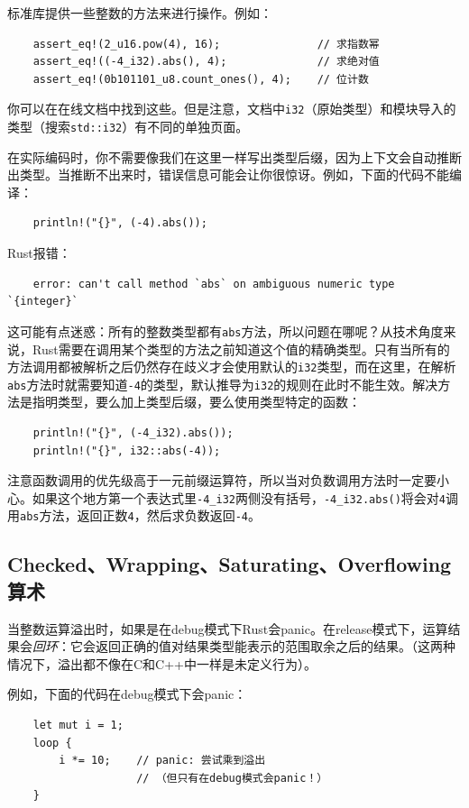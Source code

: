 标准库提供一些整数的方法来进行操作。例如：
\begin{verbatim}
    assert_eq!(2_u16.pow(4), 16);               // 求指数幂
    assert_eq!((-4_i32).abs(), 4);              // 求绝对值
    assert_eq!(0b101101_u8.count_ones(), 4);    // 位计数
\end{verbatim}

你可以在在线文档中找到这些。但是注意，文档中\texttt{i32}（原始类型）和模块导入的类型（搜索\texttt{std::i32}）有不同的单独页面。

在实际编码时，你不需要像我们在这里一样写出类型后缀，因为上下文会自动推断出类型。当推断不出来时，错误信息可能会让你很惊讶。例如，下面的代码不能编译：
\begin{verbatim}
    println!("{}", (-4).abs());
\end{verbatim}

Rust报错：
\begin{verbatim}
    error: can't call method `abs` on ambiguous numeric type `{integer}`
\end{verbatim}

这可能有点迷惑：所有的整数类型都有\texttt{abs}方法，所以问题在哪呢？从技术角度来说，Rust需要在调用某个类型的方法之前知道这个值的精确类型。只有当所有的方法调用都被解析之后仍然存在歧义才会使用默认的\texttt{i32}类型，而在这里，在解析\texttt{abs}方法时就需要知道\texttt{-4}的类型，默认推导为\texttt{i32}的规则在此时不能生效。解决方法是指明类型，要么加上类型后缀，要么使用类型特定的函数：
\begin{verbatim}
    println!("{}", (-4_i32).abs());
    println!("{}", i32::abs(-4));
\end{verbatim}

注意函数调用的优先级高于一元前缀运算符，所以当对负数调用方法时一定要小心。如果这个地方第一个表达式里\texttt{-4\_i32}两侧没有括号，\texttt{-4\_i32.abs()}将会对\texttt{4}调用\texttt{abs}方法，返回正数\texttt{4}，然后求负数返回\texttt{-4}。

\subsection{Checked、Wrapping、Saturating、Overflowing算术}

当整数运算溢出时，如果是在debug模式下Rust会panic。在release模式下，运算结果会\emph{回环}：它会返回正确的值对结果类型能表示的范围取余之后的结果。（这两种情况下，溢出都不像在C和C++中一样是未定义行为）。

例如，下面的代码在debug模式下会panic：
\begin{verbatim}
    let mut i = 1;
    loop {
        i *= 10;    // panic: 尝试乘到溢出
                    // （但只有在debug模式会panic！）
    }
\end{verbatim}

